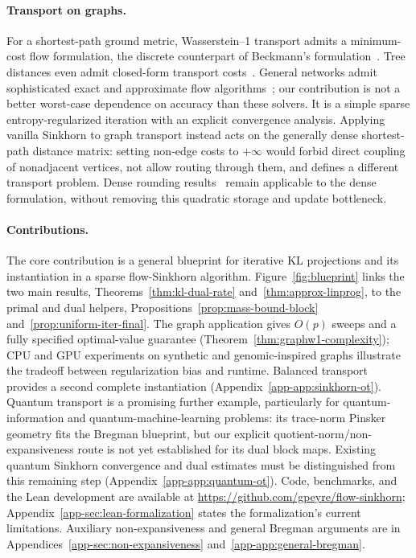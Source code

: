 \paragraph{Transport on graphs.}
For a shortest-path ground metric, Wasserstein--1 transport admits a minimum-cost flow formulation, the discrete counterpart of Beckmann's formulation~\citep{Beckmann52,AhujaEtAl93}. Tree distances even admit closed-form transport costs~\citep{evans2012phylogenetic}. General networks admit sophisticated exact and approximate flow algorithms~\citep{orlin1993minimum,daitch2008faster}; our contribution is not a better worst-case dependence on accuracy than these solvers. It is a simple sparse entropy-regularized iteration with an explicit convergence analysis. Applying vanilla Sinkhorn to graph transport instead acts on the generally dense shortest-path distance matrix: setting non-edge costs to $+\infty$ would forbid direct coupling of nonadjacent vertices, not allow routing through them, and defines a different transport problem. Dense rounding results~\citep{altschuler2017near} remain applicable to the dense formulation, without removing this quadratic storage and update bottleneck.

\paragraph{Contributions.}
The core contribution is a general blueprint for iterative KL projections and its instantiation in a sparse flow-Sinkhorn algorithm. Figure~\ref{fig:blueprint} links the two main results, Theorems~\ref{thm:kl-dual-rate} and~\ref{thm:approx-linprog}, to the primal and dual helpers, Propositions~\ref{prop:mass-bound-block} and~\ref{prop:uniform-iter-final}. The graph application gives $O(p)$ sweeps and a fully specified optimal-value guarantee (Theorem~\ref{thm:graphw1-complexity}); CPU and GPU experiments on synthetic and genomic-inspired graphs illustrate the tradeoff between regularization bias and runtime. Balanced transport provides a second complete instantiation (Appendix~\ref{app-app:sinkhorn-ot}). Quantum transport is a promising further example, particularly for quantum-information and quantum-machine-learning problems: its trace-norm Pinsker geometry fits the Bregman blueprint, but our explicit quotient-norm/non-expansiveness route is not yet established for its dual block maps. Existing quantum Sinkhorn convergence and dual estimates must be distinguished from this remaining step (Appendix~\ref{app-app:quantum-ot}). Code, benchmarks, and the Lean development are available at \url{https://github.com/gpeyre/flow-sinkhorn}; Appendix~\ref{app-sec:lean-formalization} states the formalization's current limitations. Auxiliary non-expansiveness and general Bregman arguments are in Appendices~\ref{app-sec:non-expansiveness} and~\ref{app-app:general-bregman}.

